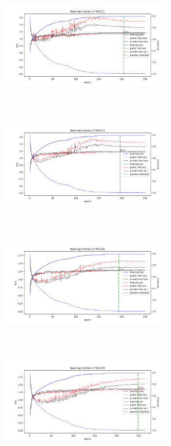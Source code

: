 \documentclass[journal, onecolumn]{IEEEtran}
\begin{document}
\begin{figure}[htb]
\begin{minipage}[t]{0.5\textwidth}
\includegraphics[width=3.5in, height=2.5in]{VGG11.png}
\end{minipage}%
\begin{minipage}[t]{0.5\textwidth}
\includegraphics[width=3.5in, height=2.5in]{VGG13.png}
\end{minipage}%

\begin{minipage}[t]{0.5\textwidth}
\includegraphics[width=3.5in, height=2.5in]{VGG16.png}
\end{minipage}%
\begin{minipage}[t]{0.5\textwidth}
\includegraphics[width=3.5in, height=2.5in]{VGG19.png}
\end{minipage}%


\end{figure}
\end{document}
